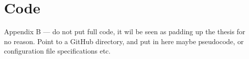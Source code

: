 \chapter{Code}

Appendix B — do not put full code, it wil be seen as padding up the thesis for no reason. Point to a GitHub directory, and put in here maybe pseudocode, or configuration file specifications etc. 